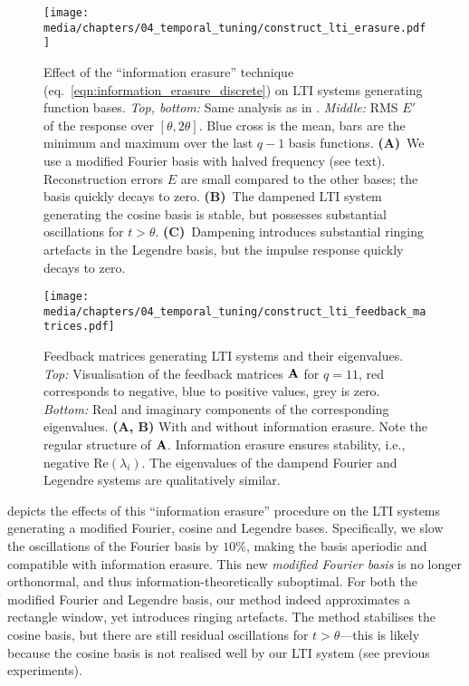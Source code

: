\begin{figure}
	\centering
	\texttt{[image: media/chapters/04\_temporal\_tuning/construct\_lti\_erasure.pdf]}%
	{\label{fig:construct_lti_erasure_a}}%
	{\label{fig:construct_lti_erasure_b}}%
	{\label{fig:construct_lti_erasure_c}}
	\caption[Effect of the \enquote{information erasure} technique on LTI systems generating function bases]{
	Effect of the \enquote{information erasure} technique (eq.~\ref{eqn:information_erasure_discrete}) on LTI systems generating function bases.
	\emph{Top, bottom:} Same analysis as in .
	\emph{Middle:} RMS $E'$ of the response over $[\theta, 2\theta]$.
	Blue cross is the mean, bars are the minimum and maximum over the last $q - 1$ basis functions.
	\textbf{(A)}~We use a modified Fourier basis with halved frequency (see text).
	Reconstruction errors $E$ are small compared to the other bases; the basis quickly decays to zero.
	\textbf{(B)}~The dampened LTI system generating the cosine basis is stable, but possesses substantial oscillations for $t > \theta$.
	\textbf{(C)}~Dampening introduces substantial ringing artefacts in the Legendre basis, but the impulse response quickly decays to zero.
	}
	\label{fig:construct_lti_erasure}
\end{figure}

\begin{figure}
	\centering
	\texttt{[image: media/chapters/04\_temporal\_tuning/construct\_lti\_feedback\_matrices.pdf]}
	\caption[Feedback matrices generating LTI systems and their eigenvalues]{Feedback matrices generating LTI systems and their eigenvalues.
	\emph{Top:} Visualisation of the feedback matrices $\mathbf{A}$ for $q = 11$, red corresponds to negative, blue to positive values, grey is zero. \emph{Bottom:} Real and imaginary components of the corresponding eigenvalues. \textbf{(A, B)} With and without information erasure.
	Note the regular structure of $\mathbf{A}$. Information erasure ensures stability, i.e., negative $\mathrm{Re}(\lambda_i)$.
	The eigenvalues of the dampend Fourier and Legendre systems are qualitatively similar.
	}
	\label{fig:construct_lti_feedback_matrices}
\end{figure}

 depicts the effects of this \enquote{information erasure} procedure on the LTI systems generating a modified Fourier, cosine and Legendre bases.
Specifically, we slow the oscillations of the Fourier basis by $10\%$, making the basis aperiodic and compatible with information erasure.
This new \emph{modified Fourier basis} is no longer orthonormal, and thus information-theoretically suboptimal.
For both the modified Fourier and Legendre basis, our method indeed approximates a rectangle window, yet introduces ringing artefacts.
The method stabilises the cosine basis, but there are still residual oscillations for $t > \theta$---this is likely because the cosine basis is not realised well by our LTI system (see previous experiments).

